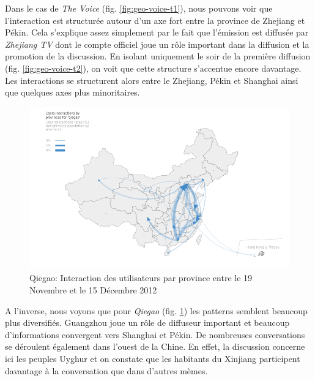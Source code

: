 Dans le cas de \textit{The Voice} (fig. \ref{fig:geo-voice-t1}), nous pouvons voir que l{\textquoteright}interaction est structurée autour d{\textquoteright}un axe fort entre la province de Zhejiang et Pékin. Cela s{\textquoteright}explique assez simplement par le fait que l{\textquoteright}émission est diffusée par \textit{Zhejiang TV} dont le compte officiel joue un r\^ole important dans la diffusion et la promotion de la discussion. En isolant uniquement le soir de la première diffusion (fig. \ref{fig:geo-voice-t2}), on voit que cette structure s{\textquoteright}accentue encore davantage. Les interactions se structurent alors entre le Zhejiang, Pékin et Shanghai ainsi que quelques axes plus minoritaires.

\begin{figure}[htbp]
    \centering
    \includegraphics[scale=.35]{figures/chap4/chapitre4-img21.png}
    \caption{
      Qiegao: Interaction des utilisateurs par province entre le 19 Novembre et le 15 Décembre 2012
    }
    \label{fig:geo-qiegao-t0}
\end{figure}

A l{\textquoteright}inverse, nous voyons que pour \textit{Qiegao} (fig. \ref{fig:geo-qiegao-t0}) les patterns semblent beaucoup plus diversifiés. Guangzhou joue un r\^ole de diffuseur important et beaucoup d{\textquoteright}informations convergent vers Shanghai et Pékin. De nombreuses conversations se déroulent également dans l{\textquoteright}ouest de la Chine. En effet, la discussion concerne ici les peuples Uyghur et on constate que les habitants du Xinjiang participent davantage \`a la conversation que dans d{\textquoteright}autres mèmes.  

